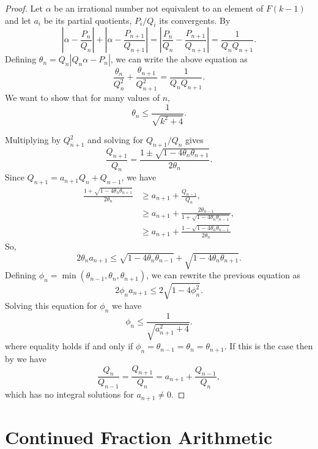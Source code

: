 \begin{proof}
Let $\alpha$ be an irrational number not equivalent to an element of
$F(k-1)$ and let $a_i$ be its partial quotients, $P_i/Q_i$ its
convergents.  By 
\[
\left|\alpha - \frac{P_n}{Q_n}\right| + 
\left|\alpha - \frac{P_{n+1}}{Q_{n+1}}\right| =
\left| \frac{P_n}{Q_n} - \frac{P_{n+1}}{Q_{n+1}}\right|
=
\frac{1}{Q_n Q_{n+1}}.
\]
Defining $\theta_n = Q_n |Q_n \alpha - P_n|$, we can write the above
equation as
\begin{equation}\label{CF:Nathan:Eqa}
\frac{\theta_n}{Q_n^2} + \frac{\theta_{n+1}}{Q_{n+1}^2} 
    = \frac{1}{Q_n Q_{n+1}}.
\end{equation}
We want to show that for many values of $n$, 
\[
\theta_n \le \frac{1}{\sqrt{k^2 + 4}}.
\]

Multiplying  by $Q_{n+1}^2$ and solving for
$Q_{n+1}/Q_n$ gives
\begin{equation}\label{CF:Nathan:Eqb}
\frac{Q_{n+1}}{Q_n} = \frac{1 \pm \sqrt{1 - 4 \theta_n
\theta_{n+1}}}{2 \theta_n}.
\end{equation}
Since $Q_{n+1} = a_{n+1} Q_n + Q_{n-1}$, we have
\[
\begin{aligned}\frac{1 + \sqrt{1 - 4 \theta_n \theta_{n+1}}}{2 \theta_n} 
  & \ge a_{n+1} + \frac{Q_{n-1}}{Q_n}, \\
  & \ge a_{n+1} + \frac{2 \theta_{n-1}}{1 + \sqrt{1 - 4 \theta_n
\theta_{n-1}}}, \\
  & \ge a_{n+1} + \frac{1 - \sqrt{1 - 4 \theta_n \theta_{n-1}}}{2 \theta_{n}}
\end{aligned}
\]
So,
\[
2 \theta_n a_{n+1} 
   \le \sqrt{1 - 4 \theta_n \theta_{n-1}} + \sqrt{1 - 4 \theta_n
\theta_{n+1}}.
\]
Defining $\phi_n = \min(\theta_{n-1}, \theta_n, \theta_{n+1})$, we can
rewrite the previous equation as
\[
2 \phi_n a_{n+1} \le 2 \sqrt{1 - 4 \phi_n^2}.
\]
Solving this equation for $\phi_n$ we have
\[
\phi_n \le \frac{1}{\sqrt{a_{n+1}^2 + 4}}.
\]
where equality holds if and only if $\phi_n = \theta_{n-1} = \theta_n
= \theta_{n+1}$.  If this is the case then by 
we have
\[
\frac{Q_n}{Q_{n-1}} = \frac{Q_{n+1}}{Q_{n}} = a_{n+1} +
\frac{Q_{n-1}}{Q_n},
\]
which has no integral solutions for $a_{n+1} \not= 0$.
\end{proof}

\section{Continued Fraction Arithmetic}

